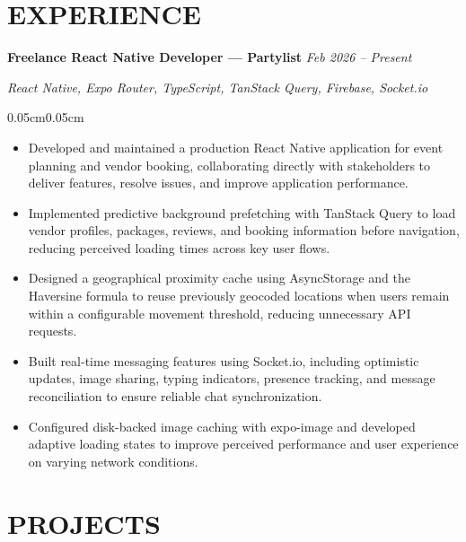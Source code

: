 \documentclass[10pt, letterpaper]{article}
\newenvironment{highlights}{
\begin{itemize}[
    topsep=0.03cm,
    itemsep=0.8pt,
    parsep=0pt,
    partopsep=0pt,
    leftmargin=0.38cm
]
}{
\end{itemize}
}
\newenvironment{onecolentry}{
\begin{adjustwidth}{0.05cm}{0.05cm}
}{
\end{adjustwidth}
}
\begin{document}
\section{EXPERIENCE}

\textbf{Freelance React Native Developer --- Partylist}
\hfill
\textit{Feb 2026 -- Present}

\textit{React Native, Expo Router, TypeScript, TanStack Query, Firebase, Socket.io}

\begin{onecolentry}
\begin{highlights}

\item Developed and maintained a production React Native application for event planning and vendor booking, collaborating directly with stakeholders to deliver features, resolve issues, and improve application performance.

\item Implemented predictive background prefetching with TanStack Query to load vendor profiles, packages, reviews, and booking information before navigation, reducing perceived loading times across key user flows.

\item Designed a geographical proximity cache using AsyncStorage and the Haversine formula to reuse previously geocoded locations when users remain within a configurable movement threshold, reducing unnecessary API requests.

\item Built real-time messaging features using Socket.io, including optimistic updates, image sharing, typing indicators, presence tracking, and message reconciliation to ensure reliable chat synchronization.

\item Configured disk-backed image caching with expo-image and developed adaptive loading states to improve perceived performance and user experience on varying network conditions.

\end{highlights}
\end{onecolentry}

\vspace{0.15cm}


\section{PROJECTS}
\vspace{0.10cm}
\end{document}
